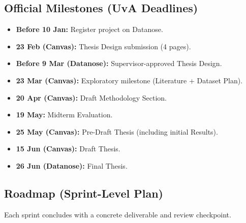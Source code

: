 \subsection{Official Milestones (UvA Deadlines)}
\begin{itemize}
    \item \textbf{Before 10 Jan:} Register project on Datanose.
    \item \textbf{23 Feb (Canvas):} Thesis Design submission (4 pages).
    \item \textbf{Before 9 Mar (Datanose):} Supervisor-approved Thesis Design.
    \item \textbf{23 Mar (Canvas):} Exploratory milestone (Literature + Dataset Plan).
    \item \textbf{20 Apr (Canvas):} Draft Methodology Section.
    \item \textbf{19 May:} Midterm Evaluation.
    \item \textbf{25 May (Canvas):} Pre-Draft Thesis (including initial Results).
    \item \textbf{15 Jun (Canvas):} Draft Thesis.
    \item \textbf{26 Jun (Datanose):} Final Thesis.
\end{itemize}

\subsection{Roadmap (Sprint-Level Plan)}
Each sprint concludes with a concrete deliverable and review checkpoint.

